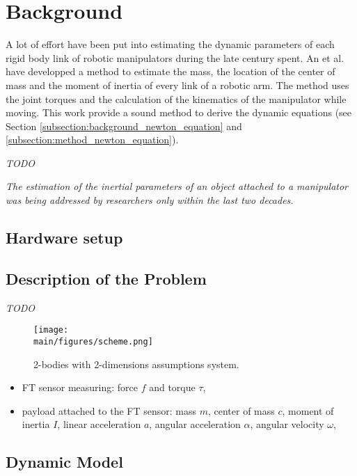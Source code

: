 \documentclass[/home/francois/latex/report/main.tex]{subfiles}
\begin{document}
\chapter{Background}
\label{chapter:background}

A lot of effort have been put into estimating the dynamic parameters of each rigid body link of robotic manipulators during the late century spent. An et al. \cite{An1985} have developped a method to estimate the mass, the location of the center of mass and the moment of inertia of every link of a robotic arm. The method uses the joint torques and the calculation of the kinematics of the manipulator while moving. This work provide a sound method to derive the dynamic equations (see Section \ref{subsection:background_newton_equation} and \ref{subsection:method_newton_equation}).

\textit{TODO}

{\it
The estimation of the inertial parameters of an object attached to a manipulator was being addressed by researchers only within the last two decades.
}

\section{Hardware setup}



\section{Description of the Problem}
\label{section:description}

\textit{TODO}

\begin{figure}[H]
  \centering
  \texttt{[image: \\main/figures/scheme.png]}
  \caption{2-bodies with 2-dimensions assumptions system.}
  \label{fig:background:payload_sensor}
\end{figure}

\begin{itemize}
 \item \ac{FT} sensor measuring: force $f$ and torque $\tau$,
 \item payload attached to the \ac{FT} sensor: mass $m$, center of mass $c$, moment of inertia $I$, linear acceleration $a$, angular acceleration $\alpha$, angular velocity $\omega$,
\end{itemize}

\section{Dynamic Model}
\end{document}
